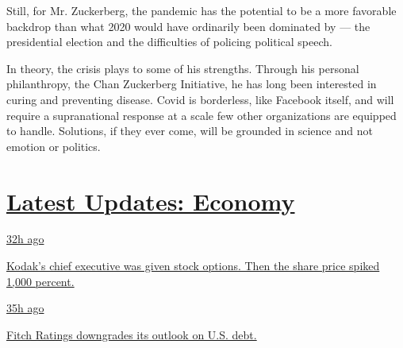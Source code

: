Still, for Mr. Zuckerberg, the pandemic has the potential to be a more
favorable backdrop than what 2020 would have ordinarily been dominated
by --- the presidential election and the difficulties of policing
political speech.

In theory, the crisis plays to some of his strengths. Through his
personal philanthropy, the Chan Zuckerberg Initiative, he has long been
interested in curing and preventing disease. Covid is borderless, like
Facebook itself, and will require a supranational response at a scale
few other organizations are equipped to handle. Solutions, if they ever
come, will be grounded in science and not emotion or politics.

\hypertarget{latest-updates-economy}{%
\section{\texorpdfstring{\href{https://www.nytimes3xbfgragh.onion/live/2020/07/31/business/stock-market-today-coronavirus?action=click\&pgtype=Article\&state=default\&region=MAIN_CONTENT_1\&context=storylines_live_updates}{Latest
Updates:
Economy}}{Latest Updates: Economy}}\label{latest-updates-economy}}

\href{https://www.nytimes3xbfgragh.onion/live/2020/07/31/business/stock-market-today-coronavirus?action=click\&pgtype=Article\&state=default\&region=MAIN_CONTENT_1\&context=storylines_live_updates\#kodaks-chief-executive-was-given-stock-options-then-the-share-price-spiked-1000-percent}{32h
ago}

\href{https://www.nytimes3xbfgragh.onion/live/2020/07/31/business/stock-market-today-coronavirus?action=click\&pgtype=Article\&state=default\&region=MAIN_CONTENT_1\&context=storylines_live_updates\#kodaks-chief-executive-was-given-stock-options-then-the-share-price-spiked-1000-percent}{Kodak's
chief executive was given stock options. Then the share price spiked
1,000 percent.}

\href{https://www.nytimes3xbfgragh.onion/live/2020/07/31/business/stock-market-today-coronavirus?action=click\&pgtype=Article\&state=default\&region=MAIN_CONTENT_1\&context=storylines_live_updates\#fitch-ratings-downgrades-its-outlook-on-us-debt}{35h
ago}

\href{https://www.nytimes3xbfgragh.onion/live/2020/07/31/business/stock-market-today-coronavirus?action=click\&pgtype=Article\&state=default\&region=MAIN_CONTENT_1\&context=storylines_live_updates\#fitch-ratings-downgrades-its-outlook-on-us-debt}{Fitch
Ratings downgrades its outlook on U.S. debt.}


